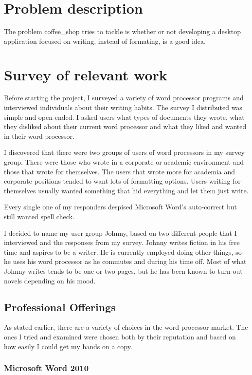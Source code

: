 \documentclass[10pt]{article}
\begin{document}
\section{Problem description}

The problem coffee\_shop tries to tackle is whether or not developing a desktop application focused on writing, instead of formating, is a good idea.

\section{Survey of relevant work}

Before starting the project, I surveyed a variety of word processor programs and interviewed individuals about their writing habits. The survey I distributed was simple and open-ended. I asked users what types of documents they wrote, what they disliked about their current word processor and what they liked and wanted in their word processor.

I discovered that there were two groups of users of word processors in my survey group. There were those who wrote in a corporate or academic environment and those that wrote for themselves. The users that wrote more for academia and corporate positions tended to want lots of formatting options. Users writing for themselves usually wanted something that hid everything and let them just write.

Every single one of my responders despised Microsoft Word's auto-correct but still wanted spell check.

I decided to name my user group Johnny, based on two different people that I interviewed and the responses from my survey. Johnny writes fiction in his free time and aspires to be a writer. He is currently employed doing other things, so he uses his word processor as he commutes and during his time off. Most of what Johnny writes tends to be one or two pages, but he has been known to turn out novels depending on his mood.

\subsection{Professional Offerings}

As stated earlier, there are a variety of choices in the word processor market. The ones I tried and examined were chosen both by their reputation and based on how easily I could get my hands on a copy.

\subsubsection{Microsoft Word 2010}
\end{document}
